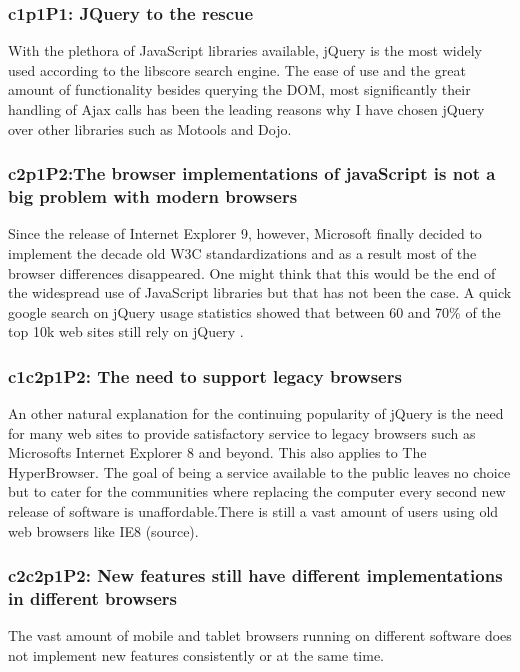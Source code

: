 \documentclass[english]{ifimaster}
\begin{document}
\subsubsection{c1p1P1: JQuery to the rescue}
With the plethora of JavaScript libraries available, jQuery is the most widely used according to the libscore search engine\parencite{infoWorld}. The ease of use and the great amount of functionality besides querying the DOM, most significantly their handling of Ajax calls has been the leading reasons why I have chosen jQuery over other libraries such as Motools and Dojo. 

\subsubsection{c2p1P2:The browser implementations of javaScript is not a big problem with modern browsers}
Since the release of Internet Explorer 9, however, Microsoft finally decided to implement the decade old W3C standardizations and as a result most of the browser differences disappeared. One might think that this would be the end of the widespread use of JavaScript libraries but that has not been the case. A quick google search on jQuery usage statistics showed that between 60 and 70\% of the top 10k web sites still rely on jQuery \parencite{jQueryWiki} \parencite{jQueryW3Tech}\parencite{builtWith}. 

\subsubsection{c1c2p1P2: The need to support legacy browsers}
An other natural explanation for the continuing popularity of jQuery is the need for many web sites to provide satisfactory service to legacy browsers such as Microsofts Internet Explorer 8 and beyond. This also applies to The HyperBrowser. The goal of being a service available to the public leaves no choice but to cater for the communities where replacing the computer every second new release of software is unaffordable.There is still a vast amount of users using old web browsers like IE8 (source). 

\subsubsection{c2c2p1P2: New features still have different implementations in different browsers}
The vast amount of mobile and tablet browsers running on different software does not implement new features consistently or at the same time.
\end{document}
